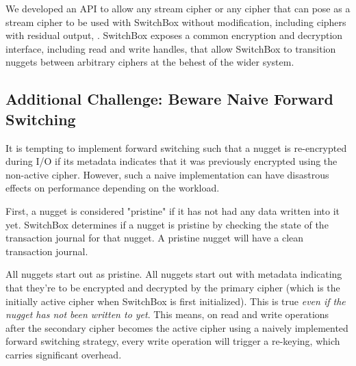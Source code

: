  We developed an API to allow any stream cipher or any
cipher that can pose as a stream cipher to be used with SwitchBox without
modification, including ciphers with residual output, .  SwitchBox exposes a common encryption and decryption interface,
including read and write handles, that allow SwitchBox to transition nuggets
between arbitrary ciphers at the behest of the wider system. 

\subsection{Additional Challenge: Beware Naive Forward Switching}

It is tempting to implement forward switching such that a nugget is re-encrypted
during I/O if its metadata indicates that it was previously encrypted using the
non-active cipher. However, such a naive implementation can have disastrous
effects on performance depending on the workload.

First, a nugget is considered "pristine" if it has not had any data written into
it yet. SwitchBox determines if a nugget is pristine by checking the state of
the transaction journal for that nugget. A pristine nugget will have a clean
transaction journal.

All nuggets start out as pristine. All nuggets start out with metadata
indicating that they're to be encrypted and decrypted by the primary cipher
(which is the initially active cipher when SwitchBox is first initialized). This
is true \emph{even if the nugget has not been written to yet}. This means, on
read and write operations after the secondary cipher becomes the active cipher
using a naively implemented forward switching strategy, every write operation
will trigger a re-keying, which carries significant overhead.

